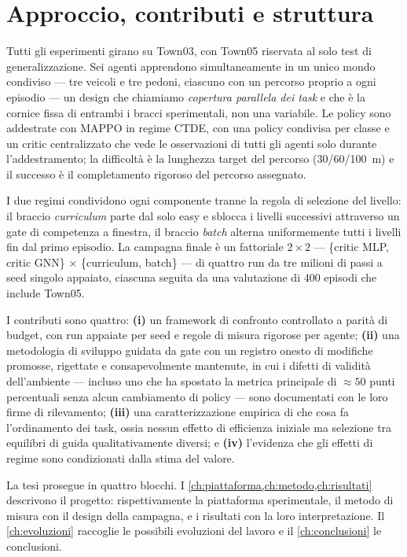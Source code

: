 \section{Approccio, contributi e struttura}
\label{sec:approccio}

Tutti gli esperimenti girano su Town03, con Town05 riservata al solo
test di generalizzazione. Sei agenti apprendono simultaneamente in un
unico mondo condiviso --- tre veicoli e tre pedoni, ciascuno con un
percorso proprio a ogni episodio --- un design che chiamiamo
\emph{copertura parallela dei task} e che è la cornice fissa di entrambi
i bracci sperimentali, non una variabile. Le policy sono addestrate con
MAPPO in regime CTDE, con una policy condivisa per classe e un critic
centralizzato che vede le osservazioni di tutti gli agenti solo durante
l'addestramento; la difficoltà è la lunghezza target del percorso
(30/60/\SI{100}{m}) e il successo è il completamento rigoroso del
percorso assegnato.

I due regimi condividono ogni componente tranne la regola di selezione
del livello: il braccio \emph{curriculum} parte dal solo easy e sblocca
i livelli successivi attraverso un gate di competenza a finestra, il
braccio \emph{batch} alterna uniformemente tutti i livelli fin dal primo
episodio. La campagna finale è un fattoriale $2 \times 2$ --- \{critic
MLP, critic GNN\} $\times$ \{curriculum, batch\} --- di quattro run da
tre milioni di passi a seed singolo appaiato, ciascuna seguita da una
valutazione di 400 episodi che include Town05.

I contributi sono quattro: \textbf{(i)} un framework di confronto
controllato a parità di budget, con run appaiate per seed e regole di
misura rigorose per agente; \textbf{(ii)} una metodologia di sviluppo
guidata da gate con un registro onesto di modifiche promosse, rigettate
e consapevolmente mantenute, in cui i difetti di validità dell'ambiente
--- incluso uno che ha spostato la metrica principale di $\approx 50$
punti percentuali senza alcun cambiamento di policy --- sono documentati
con le loro firme di rilevamento; \textbf{(iii)} una caratterizzazione
empirica di che cosa fa l'ordinamento dei task, ossia nessun effetto di
efficienza iniziale ma selezione tra equilibri di guida
qualitativamente diversi; e \textbf{(iv)} l'evidenza che gli effetti di
regime sono condizionati dalla stima del valore.

La tesi prosegue in quattro blocchi. I
\cref{ch:piattaforma,ch:metodo,ch:risultati} descrivono il progetto:
rispettivamente la piattaforma sperimentale, il metodo di misura con il
design della campagna, e i risultati con la loro interpretazione. Il
\cref{ch:evoluzioni} raccoglie le possibili evoluzioni del lavoro e il
\cref{ch:conclusioni} le conclusioni.
